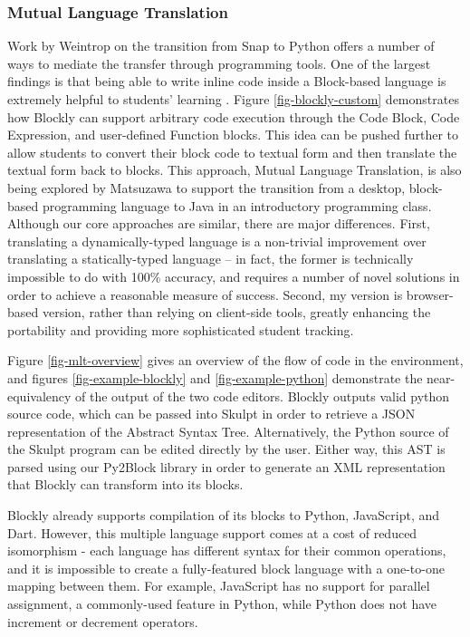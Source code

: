 \subsubsection{Mutual Language Translation}

Work by Weintrop on the transition from Snap to Python offers a number of ways to mediate the transfer through programming tools. 
One of the largest findings is that being able to write inline code inside a Block-based language is extremely helpful to students' learning \cite{Weintrop}.
Figure \ref{fig-blockly-custom} demonstrates how Blockly can support arbitrary code execution through the Code Block, Code Expression, and user-defined Function blocks.
This idea can be pushed further to allow students to convert their block code to textual form and then translate the textual form back to blocks.
This approach, Mutual Language Translation, is also being explored by Matsuzawa\cite{Matsuzawa} to support the transition from a desktop, block-based programming language to Java in an introductory programming class. 
Although our core approaches are similar, there are major differences.
First, translating a dynamically-typed language is a non-trivial improvement over translating a statically-typed language -- in fact, the former is technically impossible to do with 100\% accuracy, and requires a number of novel solutions in order to achieve a reasonable measure of success.
Second, my version is browser-based version, rather than relying on client-side tools, greatly enhancing the portability and providing more sophisticated student tracking.

Figure \ref{fig-mlt-overview} gives an overview of the flow of code in the environment, and figures \ref{fig-example-blockly} and \ref{fig-example-python} demonstrate the near-equivalency of the output of the two code editors.
Blockly outputs valid python source code, which can be passed into Skulpt in order to retrieve a JSON representation of the Abstract Syntax Tree.
Alternatively, the Python source of the Skulpt program can be edited directly by the user. 
Either way, this AST is parsed using our Py2Block library in order to generate an XML representation that Blockly can transform into its blocks.

Blockly already supports compilation of its blocks to Python, JavaScript, and Dart.
However, this multiple language support comes at a cost of reduced isomorphism - each language has different syntax for their common operations, and it is impossible to create a fully-featured block language with a one-to-one mapping between them.
For example, JavaScript has no support for parallel assignment, a commonly-used feature in Python, while Python does not have increment or decrement operators.

